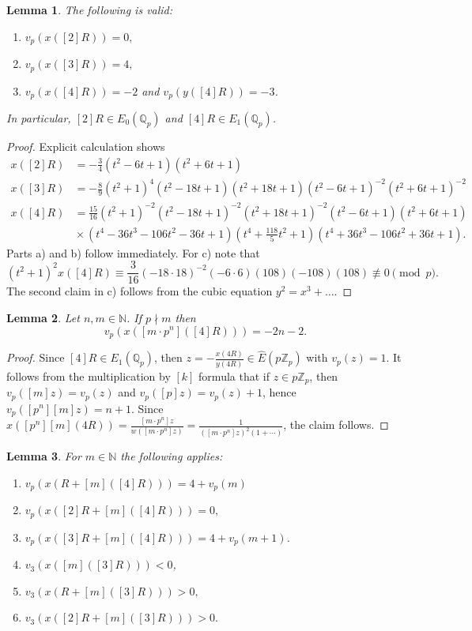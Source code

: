 \documentclass[11pt]{amsart}
\theoremstyle{plain}
\newtheorem{lemma}{Lemma}
\theoremstyle{remark}
\begin{document}
\begin{lemma} \label{lem:234}
The following is valid:
\begin{enumerate}
	\item [a)] $v_p(x([2]R))=0,$
	\item [b)] $v_p(x([3]R))=4,$
	\item [c)] $v_p(x([4]R))=-2$ and $v_p(y([4]R))=-3$.
\end{enumerate}
In particular, $[2]R \in E_0(\mathbb{Q}_p)$ and $[4]R\in E_1(\mathbb{Q}_p)$.
\end{lemma}

\begin{proof}
Explicit calculation shows
\begin{align*}
x([2]R) &=-\frac{3}{4}(t^2-6t+1)(t^2+6t+1)\\
x([3]R) &=-\frac{8}{9}(t^2+1)^4(t^2-18t+1)(t^2+18t+1)(t^2-6t+1)^{-2}(t^2+6t+1)^{-2}\\
x([4]R) &=\frac{15}{16}(t^2+1)^{-2}(t^2-18t+1)^{-2}(t^2+18t+1)^{-2}(t^2-6t+1)(t^2+6t+1)\\
&\mbox{}\times (t^4 - 36t^3 - 106t^2 - 36t + 1)(t^4 + \frac{118}{5}t^2 + 1)(t^4 + 36t^3 - 106t^2 + 36t + 1).
\end{align*}
Parts a) and b) follow immediately. For c) note that
$$(t^2+1)^2x([4]R) \equiv \frac{3}{16}(-18\cdot 18)^{-2}(-6\cdot 6)(108)(-108)(108)\not \equiv 0 \pmod {p}.$$
The second claim in c) follows from the cubic equation $y^2=x^3+\ldots$.
\end{proof}

\begin{lemma}
Let $n,m \in \mathbb{N}$. If $p\nmid m$ then
$$v_p(x([m\cdot p^n]([4]R)))=-2n-2.$$
\end{lemma}

\begin{proof}
Since $[4]R \in E_1(\mathbb{Q}_p)$, then $z=-\frac{x(4R)}{y(4R)} \in \widehat{E}(p\mathbb{Z}_p)$ with $v_p(z)=1$. It follows from the multiplication by $[k]$ formula that if $z\in p\mathbb{Z}_p$, then $v_p([m]z)=v_p(z)$ and $v_p([p]z)=v_p(z)+1$, hence $v_p([p^n][m]z)=n+1$. Since $x([p^n][m](4R))=\frac{[m\cdot p^n]z}{w([m\cdot p^n]z)}=\frac{1}{([m\cdot p^n]z)^2(1+\cdots)}$, the claim follows.
\end{proof}

\begin{lemma}
\label{lemma:valuations}
For $m \in \mathbb{N}$ the following applies:
\begin{enumerate}
	\item [a)] $v_p(x(R+[m]([4]R)))=4+v_p(m)$
	\item [b)] $v_p(x([2]R+[m]([4]R)))=0,$
	\item [c)] $v_p(x([3]R+[m]([4]R)))=4+v_p(m+1)$.
	\item [d)] $v_3(x([m]([3]R))) < 0$,
	\item [e)] $v_3(x(R+[m]([3]R))) > 0,$
	\item [f)]$v_3(x([2]R+[m]([3]R))) > 0.$
\end{enumerate}
\end{lemma}
\end{document}
